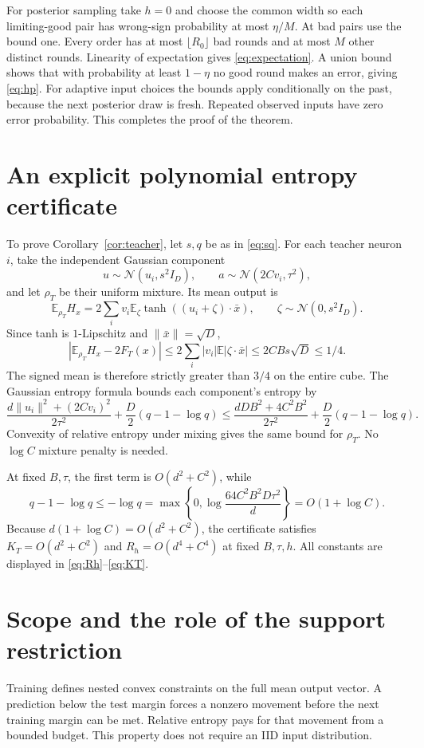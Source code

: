\documentclass[11pt]{article}
\newcommand{\E}{\mathbb E}
\begin{document}
For posterior sampling take $h=0$ and choose the common width so each
limiting-good pair has wrong-sign probability at most $\eta/M$. At bad
pairs use the bound one. Every order has at most $\lfloor R_0\rfloor$
bad rounds and at most $M$ other distinct rounds. Linearity of expectation
gives \eqref{eq:expectation}. A union bound shows that with probability
at least $1-\eta$ no good round makes an error, giving \eqref{eq:hp}.
For adaptive input choices the bounds apply conditionally on the past,
because the next posterior draw is fresh. Repeated observed inputs have
zero error probability. This completes the proof of the theorem.

\section{An explicit polynomial entropy certificate}

To prove Corollary~\ref{cor:teacher}, let $s,q$ be as in \eqref{eq:sq}.
For each teacher neuron $i$, take the independent Gaussian component
\[
 u\sim\mathcal N(u_i,s^2I_D),\qquad
 a\sim\mathcal N(2Cv_i,\tau^2),
\]
and let $\rho_T$ be their uniform mixture. Its mean output is
\[
 \E_{\rho_T}H_x
   =2\sum_i v_i\E_\zeta\tanh((u_i+\zeta)\cdot\bar x),
 \qquad\zeta\sim\mathcal N(0,s^2I_D).
\]
Since tanh is $1$-Lipschitz and $\|\bar x\|=\sqrt D$,
\[
 |\E_{\rho_T}H_x-2F_T(x)|
 \le2\sum_i|v_i|\E|\zeta\cdot\bar x|
 \le2CBs\sqrt D\le1/4.
\]
The signed mean is therefore strictly greater than $3/4$ on the entire
cube. The Gaussian entropy formula bounds each component's entropy by
\[
 \frac{d\|u_i\|^2+(2Cv_i)^2}{2\tau^2}
   +\frac D2(q-1-\log q)
 \le\frac{dDB^2+4C^2B^2}{2\tau^2}
   +\frac D2(q-1-\log q).
\]
Convexity of relative entropy under mixing gives the same bound for
$\rho_T$. No $\log C$ mixture penalty is needed.

At fixed $B,\tau$, the first term is $O(d^2+C^2)$, while
\[
 q-1-\log q\le-\log q
 =\max\left\{0,\log\frac{64C^2B^2D\tau^2}{d}\right\}
 =O(1+\log C).
\]
Because $d(1+\log C)=O(d^2+C^2)$, the certificate satisfies
$K_T=O(d^2+C^2)$ and $R_h=O(d^4+C^4)$ at fixed $B,\tau,h$.
All constants are displayed in \eqref{eq:Rh}--\eqref{eq:KT}.

\section{Scope and the role of the support restriction}

Training defines nested convex constraints on the full mean output
vector. A prediction below the test margin forces a nonzero movement
before the next training margin can be met. Relative entropy pays for
that movement from a bounded budget. This property does not require an
IID input distribution.
\end{document}
